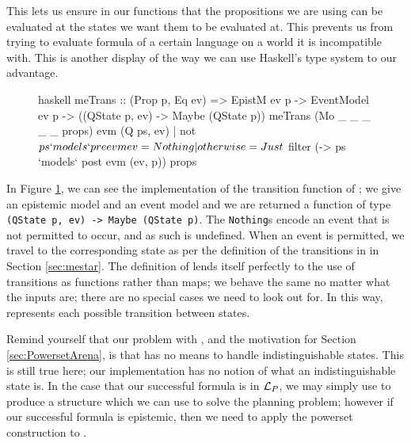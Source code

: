 \documentclass[ %
                    author={Leo Poulson},
                supervisor={Dr. Steven Ramsay},
                    degree={BSc},
                     title={Epistemic Planning for the Dynamic Gossip problem},
                  subtitle={},
                      year={2019} ]{dissertation}
\begin{document}
This lets us ensure in our functions that the propositions we are using can be
evaluated at the states we want them to be evaluated at. This prevents us from
trying to evaluate formula of a certain language on a world it is incompatible
with. This is another display of the way we can use Haskell's type system to our
advantage. 

\begin{figure}[h]
\begin{cminted}{haskell}
  meTrans :: (Prop p, Eq ev) =>
          EpistM ev p -> EventModel ev p -> ((QState p, ev) -> Maybe (QState p))
  meTrans (Mo _ _ _ _ _ props) evm    (Q ps, ev)
    | not $ ps `models` pre evm ev  = Nothing
    | otherwise                     = Just $ filter (\p -> ps `models` post evm (ev, p)) props
\end{cminted}
  \caption{}
  \label{fig:metrans}
\end{figure}

In Figure \ref{fig:metrans}, we can see the implementation of the transition
function of \mestar; we give an epistemic model and an event model and we are
returned a function of type \texttt{(QState p, ev) -> Maybe (QState
  p)}. The \texttt{Nothing}s encode an event that is not permitted to
occur, and as such is undefined. When an event is permitted, we travel to the
corresponding state as per the definition of the transitions in \mestar in
Section \ref{sec:mestar}. The definition of \mestar lends itself perfectly to
the use of transitions as functions rather than maps; we behave the same no
matter what the inputs are; there are no special cases we need to look out for.
In this way, \mestar represents each possible transition between states. 

Remind yourself that our problem with \mestar, and the motivation for Section
\ref{sec:PowersetArena}, is that \mestar has no means to handle
indistinguishable states. This is still true here; our implementation has no
notion of what an indistinguishable state is. In the case that our successful
formula is in $\mathcal{L}_P$, we may simply use \mestar to produce a structure which
we can use to solve the planning problem; however if our successful formula is
epistemic, then we need to apply the powerset construction to \mestar. 

\section{}
\end{document}
